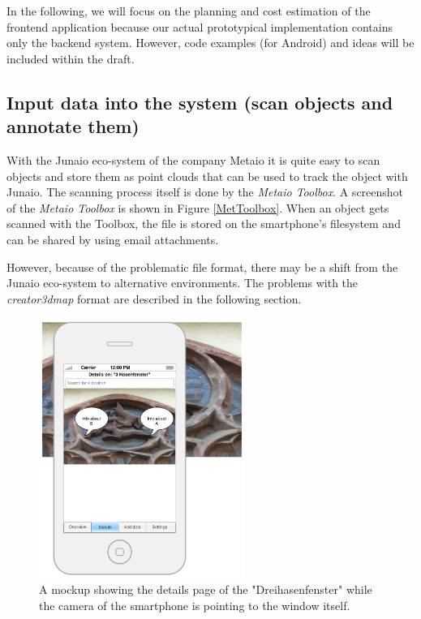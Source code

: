 In the following, we will focus on the planning and cost estimation of the frontend application because our actual prototypical implementation contains only the backend system.  However, code examples (for Android) and ideas will be included within the draft. 

\subsection{Input data into the system (scan objects and annotate them)} 
With the Junaio eco-system of the company Metaio it is quite easy to scan objects and store them as point clouds that can be used to track the object with Junaio. The scanning process itself is done by the \emph{Metaio Toolbox}. A screenshot of the \emph{Metaio Toolbox} is shown in Figure \ref{MetToolbox}. When an object gets scanned with the Toolbox, the file is stored on the smartphone's filesystem and can be shared by using email attachments.	

However, because of the problematic file format, there may be a shift from the Junaio eco-system to alternative environments. The problems with the \emph{creator3dmap} format are described in the following section.

\begin{figure}[th]
	\centerline{\includegraphics[width=0.6\textwidth]{gfx/mockup_app_2}}
	\caption{A mockup showing the details page of the "Dreihasenfenster" while the camera of the smartphone is pointing to the window itself.}
	\label{app2}
\end{figure}	

